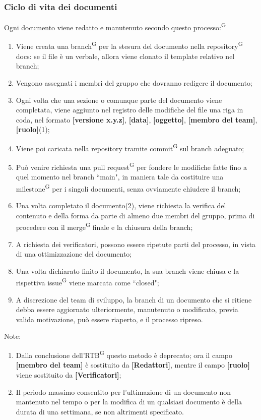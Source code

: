 \documentclass[8pt]{article}
\newcommand{\glossterm}[1]{#1\textsuperscript{G}} %
\begin{document}
\subsubsection{Ciclo di vita dei documenti}
Ogni documento viene redatto e manutenuto secondo questo \glossterm{processo:}
\begin{enumerate}
    \item Viene creata una \glossterm{branch} per la stesura del documento nella \glossterm{repository} docs: se il file è un verbale, allora viene clonato il template relativo nel branch;
    \item Vengono assegnati i membri del gruppo che dovranno redigere il documento; 
    \item Ogni volta che una sezione o comunque parte del documento viene completata, viene aggiunto
        nel registro delle modifiche del file una riga in coda, nel formato \textbf{[versione
        x.y.z]}, \textbf{[data]}, \textbf{[oggetto]}, \textbf{[membro del team]}, \textbf{[ruolo]}(1);  
    \item Viene poi caricata nella repository tramite \glossterm{commit} sul branch adeguato;
    \item Può venire richiesta una \glossterm{pull request} per fondere le modifiche fatte fino a quel momento
        nel branch ``main", in maniera tale da costituire una \glossterm{milestone} per i singoli documenti, senza ovviamente chiudere il branch;
    \item Una volta completato il documento(2), viene richiesta la verifica del contenuto e della forma
        da parte di almeno due membri del gruppo, prima di procedere con il \glossterm{merge} finale e la chiusura della branch; 
    \item A richiesta dei verificatori, possono essere ripetute parti del processo, in vista di una ottimizzazione del documento;
    \item Una volta dichiarato finito il documento, la sua branch viene chiusa e la rispettiva \glossterm{issue} viene marcata come ``closed";
    \item A discrezione del team di sviluppo, la branch di un documento che si ritiene debba essere aggiornato ulteriormente, manutenuto o modificato, previa valida motivazione, può essere riaperto, e il processo ripreso. 
\end{enumerate}
Note: \\
\begin{enumerate}
    \item Dalla conclusione dell'\glossterm{RTB} questo metodo è deprecato; ora il campo \textbf{[membro del team]} è sostituito da \textbf{[Redattori]}, mentre il campo \textbf{[ruolo]} viene sostituito da \textbf{[Verificatori]};
    \item Il periodo massimo consentito per l'ultimazione di un documento non mantenuto nel tempo o per la modifica di un qualsiasi documento è della durata di una settimana, se non altrimenti specificato.
\end{enumerate}
\end{document}
